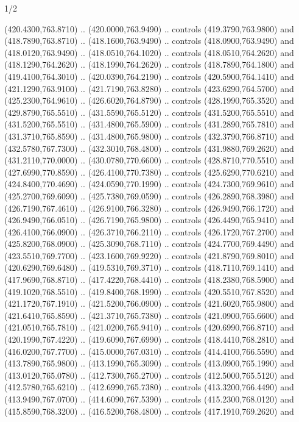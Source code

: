 \begin{flagdescription}{1/2}
\begin{scope}[xshift=0.5\flaglength]
\begin{scope}[scale=0.00745\flagwidth,xshift=-12.1mm,yshift=41.7mm]
\begin{scope}[y=0.80pt, x=0.80pt, yscale=-1, xscale=1, inner sep=0pt, outer sep=0pt]
\begin{scope}[cm={{1.33333,0.0,0.0,-1.33333,(0.0,114.66667)}}]
\begin{scope}[scale=0.100]
  (420.4300,763.8710) .. (420.0000,763.9490) .. controls (419.3790,763.9800) and
  (418.7890,763.8710) .. (418.1600,763.9490) .. controls (418.0900,763.9490) and
  (418.0120,763.9490) .. (418.0510,764.1020) .. controls (418.0510,764.2620) and
  (418.1290,764.2620) .. (418.1990,764.2620) .. controls (418.7890,764.1800) and
  (419.4100,764.3010) .. (420.0390,764.2190) .. controls (420.5900,764.1410) and
  (421.1290,763.9100) .. (421.7190,763.8280) .. controls (423.6290,764.5700) and
  (425.2300,764.9610) .. (426.6020,764.8790) .. controls (428.1990,765.3520) and
  (429.8790,765.5510) .. (431.5590,765.5120) .. controls (431.5200,765.5510) and
  (431.5200,765.5510) .. (431.4800,765.5900) .. controls (431.2890,765.7810) and
  (431.3710,765.8590) .. (431.4800,765.9800) .. controls (432.3790,766.8710) and
  (432.5780,767.7300) .. (432.3010,768.4800) .. controls (431.9880,769.2620) and
  (431.2110,770.0000) .. (430.0780,770.6600) .. controls (428.8710,770.5510) and
  (427.6990,770.8590) .. (426.4100,770.7380) .. controls (425.6290,770.6210) and
  (424.8400,770.4690) .. (424.0590,770.1990) .. controls (424.7300,769.9610) and
  (425.2700,769.6090) .. (425.7380,769.0590) .. controls (426.2890,768.3980) and
  (426.7190,767.4610) .. (426.9100,766.3280) .. controls (426.9490,766.1720) and
  (426.9490,766.0510) .. (426.7190,765.9800) .. controls (426.4490,765.9410) and
  (426.4100,766.0900) .. (426.3710,766.2110) .. controls (426.1720,767.2700) and
  (425.8200,768.0900) .. (425.3090,768.7110) .. controls (424.7700,769.4490) and
  (423.5510,769.7700) .. (423.1600,769.9220) .. controls (421.8790,769.8010) and
  (420.6290,769.6480) .. (419.5310,769.3710) .. controls (418.7110,769.1410) and
  (417.9690,768.8710) .. (417.4220,768.4410) .. controls (418.2380,768.5900) and
  (419.1020,768.5510) .. (419.8400,768.1990) .. controls (420.5510,767.8520) and
  (421.1720,767.1910) .. (421.5200,766.0900) .. controls (421.6020,765.9800) and
  (421.6410,765.8590) .. (421.3710,765.7380) .. controls (421.0900,765.6600) and
  (421.0510,765.7810) .. (421.0200,765.9410) .. controls (420.6990,766.8710) and
  (420.1990,767.4220) .. (419.6090,767.6990) .. controls (418.4410,768.2810) and
  (416.0200,767.7700) .. (415.0000,767.0310) .. controls (414.4100,766.5590) and
  (413.7890,765.9800) .. (413.1990,765.3090) .. controls (413.0900,765.1990) and
  (413.0120,765.0780) .. (412.7300,765.2700) .. controls (412.5000,765.5120) and
  (412.5780,765.6210) .. (412.6990,765.7380) .. controls (413.3200,766.4490) and
  (413.9490,767.0700) .. (414.6090,767.5390) .. controls (415.2300,768.0120) and
  (415.8590,768.3200) .. (416.5200,768.4800) .. controls (417.1910,769.2620) and

\end{scope}
\end{scope}
\end{scope}
\end{scope}
\end{scope}
\end{flagdescription}
